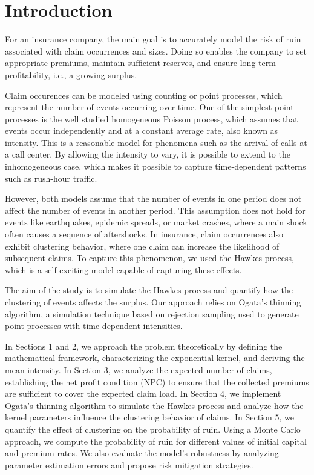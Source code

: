 \documentclass[a4paper,11pt]{article}
\begin{document}
\renewcommand{\contentsname}{Table of Contents}
\tableofcontents

\clearpage

\listoffigures
\clearpage 

\section*{Introduction}

For an insurance company, the main goal is to accurately model the risk of ruin associated with claim occurrences and sizes. Doing so enables the company to set appropriate premiums, maintain sufficient reserves, and ensure long-term profitability, i.e.,
a growing surplus. 

Claim occurences can be modeled using counting or point processes, which represent the number of events occurring over time. One of the simplest point processes is the well studied homogeneous Poisson process, which assumes that events occur independently and at a constant average rate, also known as intensity. This is a reasonable model for phenomena such as the arrival of calls at a call center. By allowing the intensity to vary, it is possible to extend to the inhomogeneous case, which makes it possible to capture time-dependent patterns such as rush-hour traffic.

However, both models assume that the number of events in one period does not affect the number of events in another period. This assumption does not hold for events like earthquakes, epidemic spreads, or market crashes, where a main shock often causes a sequence of aftershocks. In insurance, claim occurrences also exhibit clustering behavior, where one claim can increase the likelihood of subsequent claims. To capture this phenomenon, we used the Hawkes process, which is a self-exciting model capable of capturing these effects.

The aim of the study is to simulate the Hawkes process and quantify how the clustering of events affects the surplus. Our approach relies on Ogata’s thinning algorithm, a simulation technique based on rejection sampling used to generate point processes with time-dependent intensities.

In Sections 1 and 2, we approach the problem theoretically by defining the mathematical framework, characterizing the exponential kernel, and deriving the mean intensity. In Section 3, we analyze the expected number of claims, establishing the net profit condition (NPC) to ensure that the collected premiums are sufficient to cover the expected claim load. In Section 4, we implement Ogata's thinning algorithm to simulate the Hawkes process and analyze how the kernel parameters influence the clustering behavior of claims. In Section 5, we quantify the effect of clustering on the probability of ruin. Using a Monte Carlo approach, we compute the probability of ruin for different values of initial capital and premium rates. We also evaluate the model’s robustness by analyzing parameter estimation errors and propose risk mitigation strategies.
\end{document}
